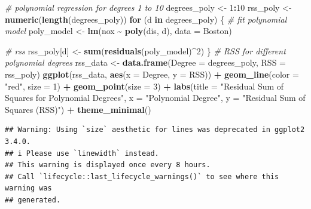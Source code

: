 \documentclass[
]{article}
\newenvironment{Shaded}{\begin{snugshade}}{\end{snugshade}}
\newcommand{\AttributeTok}[1]{\textcolor[rgb]{0.13,0.29,0.53}{#1}}
\newcommand{\CommentTok}[1]{\textcolor[rgb]{0.56,0.35,0.01}{\textit{#1}}}
\newcommand{\ControlFlowTok}[1]{\textcolor[rgb]{0.13,0.29,0.53}{\textbf{#1}}}
\newcommand{\DecValTok}[1]{\textcolor[rgb]{0.00,0.00,0.81}{#1}}
\newcommand{\FunctionTok}[1]{\textcolor[rgb]{0.13,0.29,0.53}{\textbf{#1}}}
\newcommand{\NormalTok}[1]{#1}
\newcommand{\OtherTok}[1]{\textcolor[rgb]{0.56,0.35,0.01}{#1}}
\newcommand{\SpecialCharTok}[1]{\textcolor[rgb]{0.81,0.36,0.00}{\textbf{#1}}}
\newcommand{\StringTok}[1]{\textcolor[rgb]{0.31,0.60,0.02}{#1}}
\begin{document}
\begin{Shaded}
\begin{Highlighting}[]
\CommentTok{\# polynomial regression for degrees 1 to 10}
\NormalTok{degrees\_poly }\OtherTok{\textless{}{-}} \DecValTok{1}\SpecialCharTok{:}\DecValTok{10}
\NormalTok{rss\_poly }\OtherTok{\textless{}{-}} \FunctionTok{numeric}\NormalTok{(}\FunctionTok{length}\NormalTok{(degrees\_poly))}
\ControlFlowTok{for}\NormalTok{ (d }\ControlFlowTok{in}\NormalTok{ degrees\_poly) \{}
  \CommentTok{\# fit polynomial model}
\NormalTok{  poly\_model }\OtherTok{\textless{}{-}} \FunctionTok{lm}\NormalTok{(nox }\SpecialCharTok{\textasciitilde{}} \FunctionTok{poly}\NormalTok{(dis, d), }\AttributeTok{data =}\NormalTok{ Boston)}
  
  \CommentTok{\# rss}
\NormalTok{  rss\_poly[d] }\OtherTok{\textless{}{-}} \FunctionTok{sum}\NormalTok{(}\FunctionTok{residuals}\NormalTok{(poly\_model)}\SpecialCharTok{\^{}}\DecValTok{2}\NormalTok{)}
\NormalTok{\}}
\CommentTok{\#  RSS for different polynomial degrees}
\NormalTok{rss\_data }\OtherTok{\textless{}{-}} \FunctionTok{data.frame}\NormalTok{(}\AttributeTok{Degree =}\NormalTok{ degrees\_poly, }\AttributeTok{RSS =}\NormalTok{ rss\_poly)}
\FunctionTok{ggplot}\NormalTok{(rss\_data, }\FunctionTok{aes}\NormalTok{(}\AttributeTok{x =}\NormalTok{ Degree, }\AttributeTok{y =}\NormalTok{ RSS)) }\SpecialCharTok{+}
  \FunctionTok{geom\_line}\NormalTok{(}\AttributeTok{color =} \StringTok{"red"}\NormalTok{, }\AttributeTok{size =} \DecValTok{1}\NormalTok{) }\SpecialCharTok{+}
  \FunctionTok{geom\_point}\NormalTok{(}\AttributeTok{size =} \DecValTok{3}\NormalTok{) }\SpecialCharTok{+}
  \FunctionTok{labs}\NormalTok{(}\AttributeTok{title =} \StringTok{"Residual Sum of Squares for Polynomial Degrees"}\NormalTok{,}
       \AttributeTok{x =} \StringTok{"Polynomial Degree"}\NormalTok{,}
       \AttributeTok{y =} \StringTok{"Residual Sum of Squares (RSS)"}\NormalTok{) }\SpecialCharTok{+}
  \FunctionTok{theme\_minimal}\NormalTok{()}
\end{Highlighting}
\end{Shaded}

\begin{verbatim}
## Warning: Using `size` aesthetic for lines was deprecated in ggplot2 3.4.0.
## i Please use `linewidth` instead.
## This warning is displayed once every 8 hours.
## Call `lifecycle::last_lifecycle_warnings()` to see where this warning was
## generated.
\end{verbatim}
\end{document}
